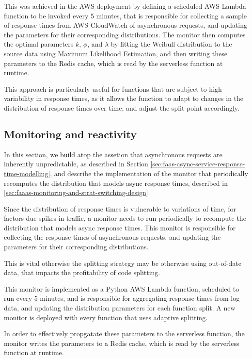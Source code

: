 This was achieved in the AWS deployment by defining a scheduled AWS Lambda function to be invoked every 5 minutes, that is responsible for collecting a sample of response times from AWS CloudWatch of asynchronous requests, and updating the parameters for their corresponding distributions. The monitor then computes the optimal parameters $k$, $\phi$, and $\lambda$ by fitting the Weibull distribution to the source data using Maximum Likelihood Estimation, and then writing these parameters to the Redis cache, which is read by the serverless function at runtime.

This approach is particularly useful for functions that are subject to high variability in response times, as it allows the function to adapt to changes in the distribution of response times over time, and adjust the split point accordingly.

\subsection{Monitoring and reactivity}
In this section, we build atop the assetion that asynchronous requests are inherently unpredictable, as described in Section \ref{sec:faas-async-service-response-time-modelling}, and describe the implementation of the monitor that periodically recomputes the distribution that models async response times, described in \ref{sec:faaas-monitoring-and-strat-switching-design}.

Since the distribution of response times is vulnerable to variations of time, for factors due spikes in traffic, a monitor needs to run periodically to recompute the distribution that models async response times. This monitor is responsible for collecting the response times of asynchronous requests, and updating the parameters for their corresponding distributions.

This is vital otherwise the splitting strategy may be otherwise using out-of-date data, that impacts the profitability of code splitting.

This monitor is implemented as a Python AWS Lambda function, scheduled to run every 5 minutes, and is responsible for aggregating response times from log data, and updating the distribution parameters for each function split. A new monitor is deployed with every function that uses adaptive splitting.

In order to effectively propgatate these parameters to the serverless function, the monitor writes the parameters to a Redis cache, which is read by the serverless function at runtime.
